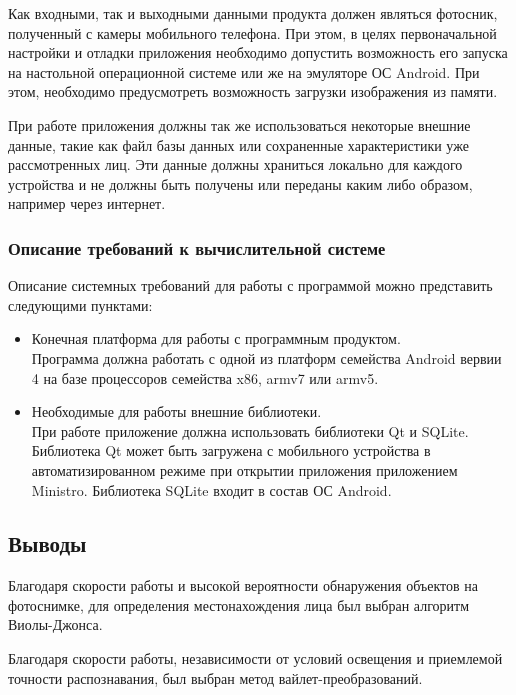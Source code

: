 Как входными, так и выходными данными продукта должен являться фотосник,
полученный с камеры мобильного телефона. При этом, в целях первоначальной
настройки и отладки приложения необходимо допустить возможность его запуска
на настольной операционной системе или же на эмуляторе ОС Android.
При этом, необходимо предусмотреть возможность загрузки изображения из
памяти.

При работе приложения должны так же использоваться некоторые внешние данные,
такие как файл базы данных или сохраненные характеристики уже рассмотренных лиц.
Эти данные должны храниться локально для каждого устройства и не должны быть
получены или переданы каким либо образом, например через интернет.

\subsubsection{Описание требований к вычислительной системе}

Описание системных требований для работы с программой
можно представить следующими пунктами:
\begin{itemize}
    \item Конечная платформа для работы с программным продуктом. \\
        Программа должна работать с одной из платформ семейства Android вервии
        4 на базе процессоров семейства x86, armv7 или armv5.
    \item Необходимые для работы внешние библиотеки. \\
        При работе приложение должна использовать библиотеки Qt и SQLite.
        Библиотека Qt может быть загружена с мобильного устройства в
        автоматизированном режиме при открытии приложения
        приложением Ministro\cite{ministro}.
        Библиотека SQLite входит в состав ОС Android.
\end{itemize}

\subsection*{Выводы}

Благодаря скорости работы и высокой вероятности обнаружения объектов на фотоснимке,
для определения местонахождения лица был выбран алгоритм Виолы-Джонса.

Благодаря скорости работы, независимости от условий освещения и приемлемой
точности распознавания, был выбран метод вайлет-преобразований.



\clearpage

